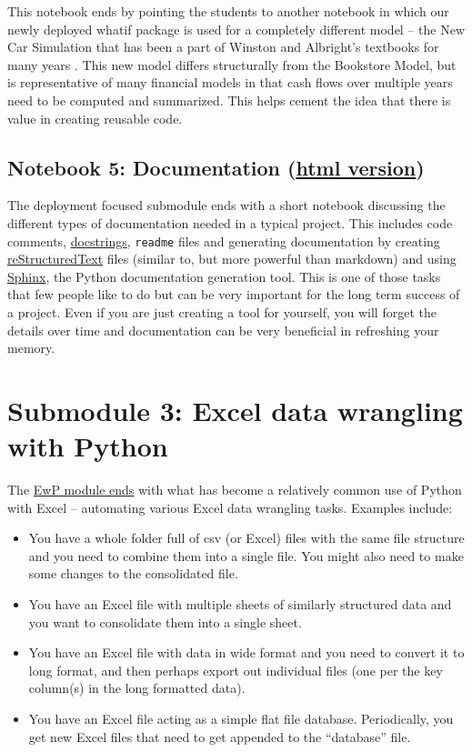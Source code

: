 \documentclass[ited,blindrev]{informs3}              %
\newcommand{\code}[1]{\texttt{#1}}
\begin{document}
This notebook ends by pointing the students to another notebook in which our newly deployed whatif package is used for a completely different model -- the New Car Simulation that has been a part of Winston and Albright's textbooks for many years \citep{winstonPracticalManagementScience2018,albrightBusinessAnalyticsData2016}. This new model differs structurally from the Bookstore Model, but is representative of many financial models in that cash flows over multiple years need to be computed and summarized. This helps cement the idea that there is value in creating reusable code.

\subsection{Notebook 5: Documentation (\href{http://www.sba.oakland.edu/faculty/isken/excel_with_python/what_if_5_documentation.html}{html version})}

The deployment focused submodule ends with a short notebook discussing the different types of documentation needed in a typical project. This includes code comments, \href{https://peps.python.org/pep-0257/}{docstrings}, \code{readme} files and generating documentation by creating \href{https://www.sphinx-doc.org/en/master/usage/restructuredtext/basics.html}{reStructuredText} files (similar to, but more powerful than markdown) and using \href{https://www.sphinx-doc.org/en/master/index.html}{Sphinx}, the Python documentation generation tool. This is one of those tasks that few people like to do but can be very important for the long term success of a project. Even if you are just creating a tool for yourself, you will forget the details over time and documentation can be very beneficial in refreshing your memory. 

\section{Submodule 3: Excel data wrangling with Python}

The \href{http://www.sba.oakland.edu/faculty/isken/courses/aap/mod3c_python_excel.html}{EwP module ends} with what has become a relatively common use of Python with Excel -- automating various Excel data wrangling tasks. Examples include:

\begin{itemize}
	\item
	You have a whole folder full of csv (or Excel) files with the same
	file structure and you need to combine them into a single file. You
	might also need to make some changes to the consolidated file.
	\item
	You have an Excel file with multiple sheets of similarly structured
	data and you want to consolidate them into a single sheet.
	\item
	You have an Excel file with data in wide format and you need to
	convert it to long format, and then perhaps export out individual
	files (one per the key column(s) in the long formatted data).
	\item
	You have an Excel file acting as a simple flat file database.
	Periodically, you get new Excel files that need to get appended to the
	``database'' file.
\end{itemize}
\end{document}
